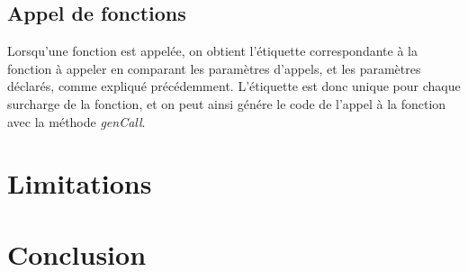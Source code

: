 \documentclass[11pt,a4paper]{report}
\begin{document}
\subsection{Appel de fonctions}

Lorsqu'une fonction est appelée, on obtient l'étiquette correspondante à la fonction à appeler en comparant les paramètres d'appels, et les paramètres déclarés, comme expliqué précédemment. 
L'étiquette est donc unique pour chaque surcharge de la fonction, et on peut ainsi génére le code de l'appel à la fonction avec la méthode \textsl{genCall}.


\section{Limitations}


\section*{Conclusion}
\end{document}
